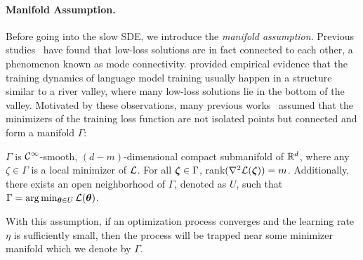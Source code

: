 \paragraph{Manifold Assumption.}
Before going into the slow SDE, we introduce the \textit{manifold assumption}. 
Previous studies~\citep{garipov2018losssurfacesmodeconnectivity,kuditipudi2019explaining} have found that low-loss solutions are in fact connected to each other, a phenomenon known as mode connectivity.
\citet{wen2024understandingwarmupstabledecaylearningrates} provided empirical evidence that the training dynamics of language model training usually happen in a structure similar to a river valley, where many low-loss solutions lie in the bottom of the valley.
Motivated by these observations, many previous works~\citep{li2021happens,fehrman2020convergence,lyu2020gradient,gu2023and} assumed that the minimizers of the training loss function are not isolated points but connected and form a manifold $\Gamma$:
\begin{assumption}%
\label{amp:low-rank-manifold}
    $\Gamma$ is $\mathcal{C}^{\infty}$-smooth, $(d-m)$-dimensional compact submanifold of $\mathbb{R}^d$, where any $\zeta \in \Gamma$ is a local minimizer of $\mathcal{L}$. For all ${\bm{\zeta}} \in \Gamma$, rank$(\nabla^2 \mathcal{L}({\bm{\zeta}})) = m$. Additionally, there exists an open neighborhood of $\Gamma$, denoted as $U$, such that $\Gamma = \arg \min_{{\bm{\theta}} \in U}\mathcal{L}({\bm{\theta}})$. 
\end{assumption}
With this assumption, if an optimization process converges and the learning rate $\eta$ is sufficiently small, then the process will be trapped near some minimizer manifold which we denote by $\Gamma$. 
